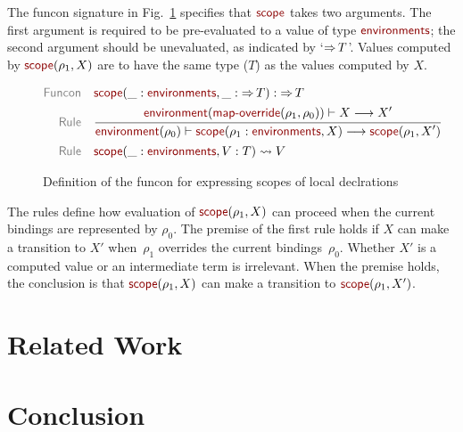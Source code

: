 \documentclass[runningheads,fleqn]{llncs}
\begin{document}
The funcon signature in Fig.~\ref{fig:scope} specifies that $\NAME{scope}$ takes two arguments.
The first argument is required to be pre-evaluated to a value of type $\NAME{environments}$;
the second argument should be unevaluated, as indicated by `$\mathop{\Rightarrow} T$'.
Values computed by $\NAME{scope}( \rho_1, X )$ are to have the same type ($T$)
as the values computed by $X$.
%
\begin{figure}
    \centering

\begin{align*}
  \KEY{Funcon} \quad
  & \NAME{scope}( \_ : \NAME{environments}, \_ :  \TO T) 
    :  \TO T 
\\
  \KEY{Rule} \quad
    & \RULE{
      \NAME{environment} (  \NAME{map-override}
                                     (  \rho_1, 
                                            \rho_0 ) ) \vdash X \TRANS 
          X'
      }{
      \NAME{environment} (  \rho_0 ) \vdash \NAME{scope}
                      (  \rho_1 : \NAME{environments}, 
                             X ) \TRANS 
          \NAME{scope}
            (  \rho_1, 
                   X' )
      }
\\
  \KEY{Rule} \quad
    & \NAME{scope}
        (  \_ : \NAME{environments}, V : T ) \leadsto V
\end{align*}

    \caption{Definition of the funcon for expressing scopes of local declrations}
    \label{fig:scope}
\end{figure}

The rules define how evaluation of $\NAME{scope}( \rho_1, X )$ can proceed
when the current bindings are represented by $\rho_0$.
%
%
The premise of the first rule holds if $X$ can make a transition to $X'$
when~$\rho_1$ overrides the current bindings~$\rho_0$.
Whether $X'$ is a computed value or an intermediate term is irrelevant.
When the premise holds, the conclusion is that $\NAME{scope}( \rho_1, X )$
can make a transition to $\NAME{scope}( \rho_1, X' )$.


\section{Related Work}
\label{sec:related}


\section{Conclusion} 
\label{sec:conclusion}

\end{document}
